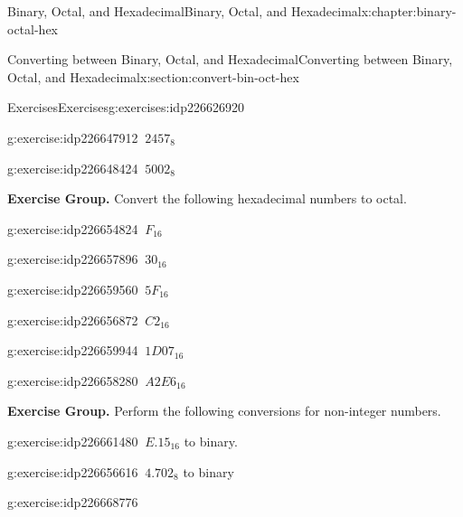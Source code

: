 \documentclass[twoside,10pt,]{book}
\numberwithin{equation}{section}
\begin{document}
\begin{chapterptx}{Binary, Octal, and Hexadecimal}{}{Binary, Octal, and Hexadecimal}{}{}{x:chapter:binary-octal-hex}
\begin{sectionptx}{Converting between Binary, Octal, and Hexadecimal}{}{Converting between Binary, Octal, and Hexadecimal}{}{}{x:section:convert-bin-oct-hex}
\begin{exercises-subsection}{Exercises}{}{Exercises}{}{}{g:exercises:idp226626920}
\begin{exercisegroup}
\begin{divisionexerciseeg}{29}{}{}{g:exercise:idp226647912}%
\(\ 2457_8\)\end{divisionexerciseeg}%
\begin{divisionexerciseeg}{30}{}{}{g:exercise:idp226648424}%
\(\ 5002_8\)\end{divisionexerciseeg}%
\end{exercisegroup}
\par\medskip\noindent
\par\medskip\noindent%
\textbf{Exercise Group.}\space\space%
Convert the following hexadecimal numbers to octal.\begin{exercisegroup}
\begin{divisionexerciseeg}{31}{}{}{g:exercise:idp226654824}%
\(\ F_{16}\)\end{divisionexerciseeg}%
\begin{divisionexerciseeg}{32}{}{}{g:exercise:idp226657896}%
\(\ 30_{16}\)\end{divisionexerciseeg}%
\begin{divisionexerciseeg}{33}{}{}{g:exercise:idp226659560}%
\(\ 5F_{16}\)\end{divisionexerciseeg}%
\begin{divisionexerciseeg}{34}{}{}{g:exercise:idp226656872}%
\(\ C2_{16}\)\end{divisionexerciseeg}%
\begin{divisionexerciseeg}{35}{}{}{g:exercise:idp226659944}%
\(\ 1D07_{16}\)\end{divisionexerciseeg}%
\begin{divisionexerciseeg}{36}{}{}{g:exercise:idp226658280}%
\(\ A2E6_{16}\)\end{divisionexerciseeg}%
\end{exercisegroup}
\par\medskip\noindent
\par\medskip\noindent%
\textbf{Exercise Group.}\space\space%
Perform the following conversions for non-integer numbers.\begin{exercisegroup}
\begin{divisionexerciseeg}{37}{}{}{g:exercise:idp226661480}%
\(\ E.15_{16}\) to binary.\end{divisionexerciseeg}%
\begin{divisionexerciseeg}{38}{}{}{g:exercise:idp226656616}%
\(\ 4.702_8\) to binary\end{divisionexerciseeg}%
\begin{divisionexerciseeg}{39}{}{}{g:exercise:idp226668776}%

\end{divisionexerciseeg}
\end{exercisegroup}
\end{exercises-subsection}
\end{sectionptx}
\end{chapterptx}
\end{document}
